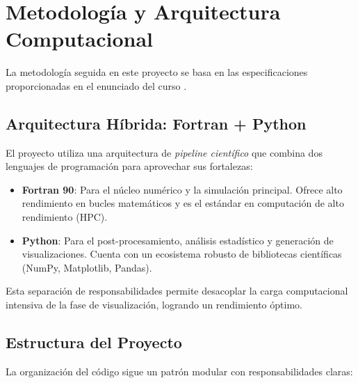 
\chapter{Metodología y Arquitectura Computacional}
\label{cap:metodologia}

La metodología seguida en este proyecto se basa en las especificaciones proporcionadas en el enunciado del curso \cite{proyecto-molina2024}.

\section{Arquitectura Híbrida: Fortran + Python}
El proyecto utiliza una arquitectura de \textit{pipeline científico} que combina dos lenguajes de programación para aprovechar sus fortalezas:

\begin{itemize}
    \item \textbf{Fortran 90}: Para el núcleo numérico y la simulación principal. Ofrece alto rendimiento en bucles matemáticos y es el estándar en computación de alto rendimiento (HPC).
    \item \textbf{Python}: Para el post-procesamiento, análisis estadístico y generación de visualizaciones. Cuenta con un ecosistema robusto de bibliotecas científicas (NumPy, Matplotlib, Pandas).
\end{itemize}

Esta separación de responsabilidades permite desacoplar la carga computacional intensiva de la fase de visualización, logrando un rendimiento óptimo.

\section{Estructura del Proyecto}
La organización del código sigue un patrón modular con responsabilidades claras:

